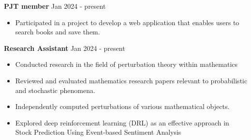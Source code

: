 \documentclass[a4paper,12pt]{article}
\begin{document}
\textbf{PJT member} \hfill \textnormal{Jan 2024 - present}
\begin{itemize}
    \item Participated in a project to develop a web application that enables users to search books and save them.
\end{itemize}
\textbf{Research Assistant} \hfill \textnormal{Jan 2024 - present}
\begin{itemize}
    \item Conducted research in the field of perturbation theory within mathematics
    \item Reviewed and evaluated mathematics research papers relevant to probabilistic and stochastic phenomena.
    \item Independently computed perturbations of various mathematical objects.
    \item Explored deep reinforcement learning (DRL) as an effective approach in Stock Prediction Using Event-based Sentiment Analysis
\end{itemize}
\end{document}
